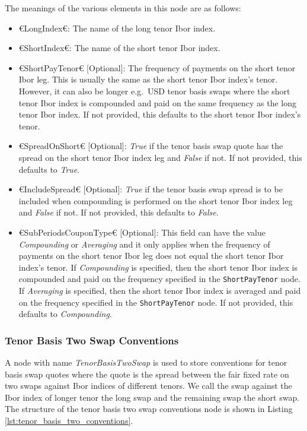 The meanings of the various elements in this node are as follows:
\begin{itemize}
\item €LongIndex€: The name of the long tenor Ibor index.
\item €ShortIndex€: The name of the short tenor Ibor index.
\item €ShortPayTenor€ [Optional]: The frequency of payments on the short tenor Ibor leg. This is usually the same as the 
short tenor Ibor index's tenor. However, it can also be longer e.g.\ USD tenor basis swaps where the short tenor Ibor 
index is compounded and paid on the same frequency as the long tenor Ibor index. If not provided, this defaults to the 
short tenor Ibor index's tenor.
\item €SpreadOnShort€ [Optional]: \emph{True} if the tenor basis swap quote has the spread on the short tenor Ibor index leg 
and \emph{False} if not. If not provided, this defaults to \emph{True}.
\item €IncludeSpread€ [Optional]: \emph{True} if the tenor basis swap spread is to be included when compounding is performed 
on the short tenor Ibor index leg and \emph{False} if not. If not provided, this defaults to \emph{False}.
\item €SubPeriodsCouponType€ [Optional]: This field can have the value \emph{Compounding} or \emph{Averaging} and it only 
applies when the frequency of payments on the short tenor Ibor leg does not equal the short tenor Ibor index's tenor. If 
\emph{Compounding} is specified, then the short tenor Ibor index is compounded and paid on the frequency specified in the 
\lstinline!ShortPayTenor! node. If \emph{Averaging} is specified, then the short tenor Ibor index is averaged and paid on 
the frequency specified in the \lstinline!ShortPayTenor! node. If not provided, this defaults to \emph{Compounding}.
\end{itemize}

\subsubsection{Tenor Basis Two Swap Conventions}
A node with name \emph{TenorBasisTwoSwap} is used to store conventions for tenor basis swap quotes where the quote is the 
spread between the fair fixed rate on two swaps against Ibor indices of different tenors. We call the swap against the 
Ibor index of longer tenor the long swap and the remaining swap the short swap. The structure of the tenor basis two swap 
conventions node is shown in Listing \ref{lst:tenor_basis_two_conventions}.

